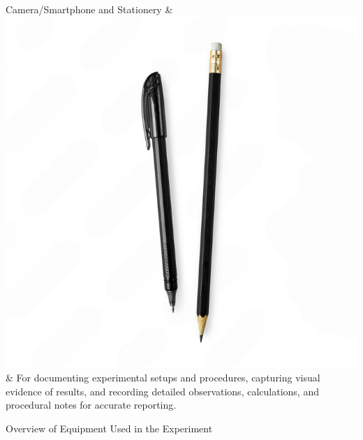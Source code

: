 \documentclass{article}
\begin{document}
\begin{table}[H]
\begin{tblr}
        Camera/Smartphone and Stationery & \includegraphics[width=\imas,valign=c]{images/stationary.png} & For documenting experimental setups and procedures, capturing visual evidence of results, and recording detailed observations, calculations, and procedural notes for accurate reporting. \\
    \end{tblr}
    \caption{Overview of Equipment Used in the Experiment}
    \label{tab:equipment_overview}
\end{table}

    

\newcommand{\mr}[2]{%
    \begin{varwidth}{#2}%
        #1%
    \end{varwidth}%
}
\end{document}
